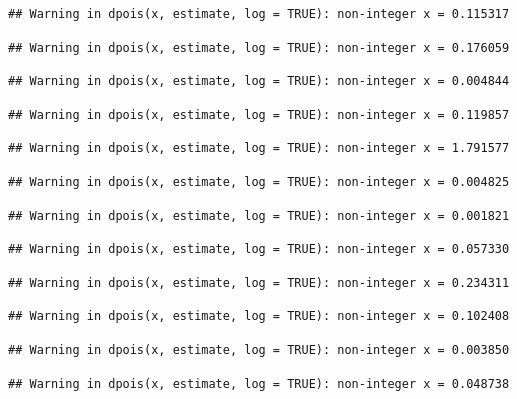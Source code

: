 \documentclass[]{article}
\begin{document}
\begin{verbatim}
## Warning in dpois(x, estimate, log = TRUE): non-integer x = 0.115317
\end{verbatim}

\begin{verbatim}
## Warning in dpois(x, estimate, log = TRUE): non-integer x = 0.176059
\end{verbatim}

\begin{verbatim}
## Warning in dpois(x, estimate, log = TRUE): non-integer x = 0.004844
\end{verbatim}

\begin{verbatim}
## Warning in dpois(x, estimate, log = TRUE): non-integer x = 0.119857
\end{verbatim}

\begin{verbatim}
## Warning in dpois(x, estimate, log = TRUE): non-integer x = 1.791577
\end{verbatim}

\begin{verbatim}
## Warning in dpois(x, estimate, log = TRUE): non-integer x = 0.004825
\end{verbatim}

\begin{verbatim}
## Warning in dpois(x, estimate, log = TRUE): non-integer x = 0.001821
\end{verbatim}

\begin{verbatim}
## Warning in dpois(x, estimate, log = TRUE): non-integer x = 0.057330
\end{verbatim}

\begin{verbatim}
## Warning in dpois(x, estimate, log = TRUE): non-integer x = 0.234311
\end{verbatim}

\begin{verbatim}
## Warning in dpois(x, estimate, log = TRUE): non-integer x = 0.102408
\end{verbatim}

\begin{verbatim}
## Warning in dpois(x, estimate, log = TRUE): non-integer x = 0.003850
\end{verbatim}

\begin{verbatim}
## Warning in dpois(x, estimate, log = TRUE): non-integer x = 0.048738
\end{verbatim}
\end{document}
